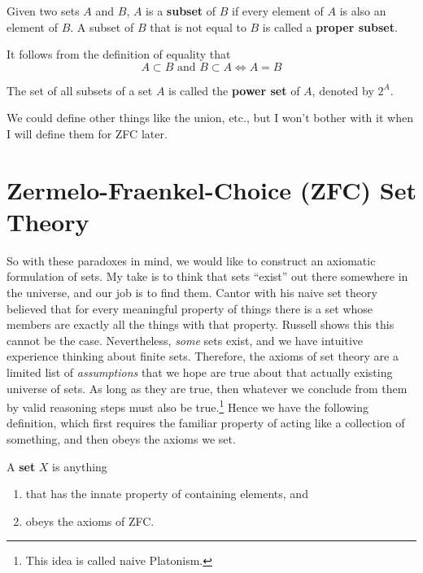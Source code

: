 \documentclass{article}
\begin{document}
    \begin{definition}[Subsets]
      Given two sets $A$ and $B$, $A$ is a \textbf{subset} of $B$ if every element of $A$ is also an element of $B$. A subset of $B$ that is not equal to $B$ is called a \textbf{proper subset}. 
    \end{definition}

    \begin{theorem}[Equality]
      It follows from the definition of equality that 
      \begin{equation}
        A \subset B \text{ and } B \subset A \iff A = B
      \end{equation}
    \end{theorem}

    \begin{definition}
      The set of all subsets of a set $A$ is called the \textbf{power set} of $A$, denoted by $2^A$. 
    \end{definition}

    We could define other things like the union, etc., but I won't bother with it when I will define them for ZFC later.  

\section{Zermelo-Fraenkel-Choice (ZFC) Set Theory} 

    So with these paradoxes in mind, we would like to construct an axiomatic formulation of sets. My take is to think that sets ``exist'' out there somewhere in the universe, and our job is to find them. Cantor with his naive set theory believed that for every meaningful property of things there is a set whose members are exactly all the things with that property. Russell shows this this cannot be the case. Nevertheless, \textit{some} sets exist, and we have intuitive experience thinking about finite sets. Therefore, the axioms of set theory are a limited list of \textit{assumptions} that we hope are true about that actually existing universe of sets. As long as they are true, then whatever we conclude from them by valid reasoning steps must also be true.\footnote{This idea is called naive Platonism.} Hence we have the following definition, which first requires the familiar property of acting like a collection of something, and then obeys the axioms we set. 
    
    \begin{definition}[Set]
      A \textbf{set} $X$ is anything 
      \begin{enumerate}
        \item that has the innate property of containing elements, and 
        \item obeys the axioms of ZFC. 
      \end{enumerate}
    \end{definition}  
\end{document}
